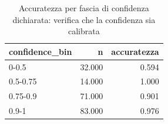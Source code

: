 \begin{table}
\centering
\caption{Accuratezza per fascia di confidenza dichiarata: verifica che la confidenza sia calibrata}
\label{tab:t2_validazione_per_confidenza}
\begin{tabular}{lrr}
\toprule
confidence\_bin &      n &  accuratezza \\
\midrule
         0-0.5 & 32.000 &        0.594 \\
      0.5-0.75 & 14.000 &        1.000 \\
      0.75-0.9 & 71.000 &        0.901 \\
         0.9-1 & 83.000 &        0.976 \\
\bottomrule
\end{tabular}
\end{table}
